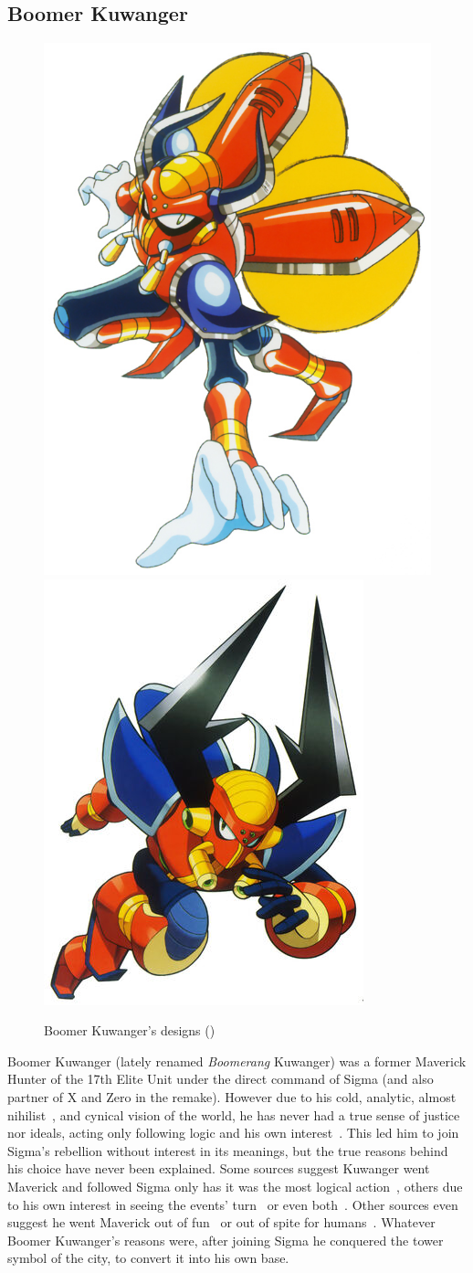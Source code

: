 \subsection{Boomer Kuwanger}\label{boss:Boomer_Kuwanger}
\begin{figure}[htp]
	\centering
	\includegraphics[width=0.4\linewidth]{figures/X1/Boomer_kuwanger/Boomer_kuwanger.jpg}
	\includegraphics[width=0.4\linewidth]{figures/X1/Boomer_kuwanger/MHXBoomerKuwanger.jpg}
	\caption{Boomer Kuwanger's designs (\cite{book:MMX_Complete_art})}
\end{figure}
Boomer Kuwanger (lately renamed \emph{Boomerang} Kuwanger) was a former Maverick Hunter of the 17th Elite Unit under the direct command of Sigma (and also partner of X and Zero in the \mhx remake). However due to his cold, analytic, almost nihilist~\cite{book:MH_field_guide}, and cynical vision of the world, he has never had a true sense of justice nor ideals, acting only following logic and his own interest~\cite{MHX:manual}. This led him to join Sigma's rebellion without interest in its meanings, but the true reasons behind his choice have never been explained. Some sources suggest Kuwanger went Maverick and followed Sigma only has it was the most logical action~\cite{MHX:manual}, others due to his own interest in seeing the events' turn~\cite{wiki:Boomer_kuwanger} or even both~\cite{book:MH_field_guide}. Other sources even suggest he went Maverick out of fun~\cite{Xcoll1:Manual_X1} or out of spite for humans~\cite{wayback:X_resources}. Whatever Boomer Kuwanger's reasons were, after joining Sigma he conquered the tower symbol of the city, to convert it into his own base.

